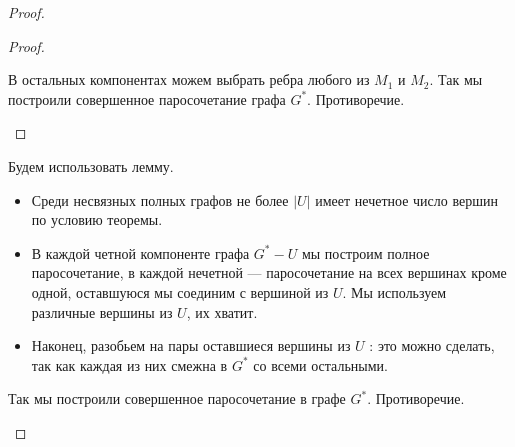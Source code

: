 \begin{proof}
\begin{description}
\begin{proof}
\begin{enumerate}
					В остальных компонентах можем выбрать ребра любого из $M_1$ и $M_2$. Так мы построили совершенное паросочетание графа $G^*$. Противоречие. 
				\end{enumerate}
			\end{proof}

			Будем использовать лемму. 

			\begin{itemize}
				\item Среди несвязных полных графов не более $\lvert U \rvert$ имеет нечетное число вершин по условию теоремы.
				\item В каждой четной компоненте графа $G^*-U$ мы построим полное паросочетание, в каждой нечетной --- паросочетание на всех вершинах кроме одной, оставшуюся мы соединим с вершиной из $U$. Мы используем различные вершины из $U$, их хватит.
				\item Наконец, разобьем на пары оставшиеся вершины из $U$ : это можно сделать, так как каждая из них смежна в $G^*$ со всеми остальными. 
			\end{itemize}
			Так мы построили совершенное паросочетание в графе $G^*$. Противоречие. 
    \end{description}
\end{proof}
